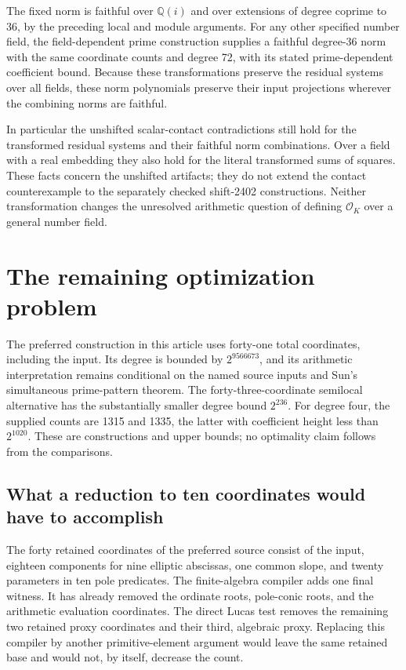 \documentclass[11pt]{article}
\theoremstyle{definition}
\begin{document}
The fixed norm is faithful over $\mathbb Q(i)$ and over
extensions of degree coprime to 36, by the preceding local
and module arguments.  For any other specified number field,
the field-dependent prime construction supplies a faithful
degree-36 norm with the same coordinate counts and degree
72, with its stated prime-dependent coefficient bound.
Because these transformations preserve the residual
systems over all fields, these norm polynomials preserve
their input projections wherever the combining norms are
faithful.

In particular the unshifted scalar-contact contradictions
still hold for the transformed residual systems and their
faithful norm combinations.  Over a field with a real
embedding they also hold for the literal transformed sums
of squares.  These facts concern the unshifted artifacts;
they do not extend the contact counterexample to the
separately checked shift-2402 constructions.  Neither
transformation changes the unresolved arithmetic question
of defining $\mathcal O_K$ over a general number field.


\section{The remaining optimization problem}
\label{sec:strategy}

The preferred construction in this article uses forty-one total
coordinates, including the input. Its degree is bounded by
$2^{9566673}$, and its arithmetic interpretation remains conditional
on the named source inputs and Sun's simultaneous prime-pattern theorem.
The forty-three-coordinate semilocal alternative has the substantially
smaller degree bound $2^{236}$. For degree four, the supplied counts
are 1315 and 1335, the latter with coefficient height less than
$2^{1020}$. These are constructions and upper bounds; no optimality
claim follows from the comparisons.

\subsection{What a reduction to ten coordinates would have to accomplish}

The forty retained coordinates of the preferred source consist of the
input, eighteen components for nine elliptic abscissas, one common
slope, and twenty parameters in ten pole predicates. The finite-algebra
compiler adds one final witness. It has already removed the ordinate
roots, pole-conic roots, and the arithmetic evaluation coordinates.
The direct Lucas test removes the remaining two retained proxy
coordinates and their third, algebraic proxy. Replacing this compiler
by another primitive-element argument would leave the same retained
base and would not, by itself, decrease the count.
\end{document}
